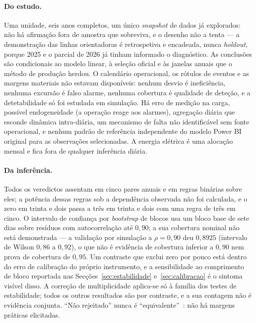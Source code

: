 \paragraph{Do estudo.} Uma unidade, seis anos completos, um único
\emph{snapshot} de dados já explorados: não há afirmação fora de amostra que
sobreviva, e o desenho não a tenta --- a demonstração das linhas
orientadoras é retrospetiva e encadeada, nunca \emph{holdout}, porque 2025 e
o parcial de 2026 já tinham informado o diagnóstico. As conclusões são
condicionais ao modelo linear, à seleção oficial e às janelas anuais que o
método de produção herdou. O calendário operacional, os rótulos de eventos e
as margens materiais não estavam disponíveis: nenhum desvio é ineficiência,
nenhuma excursão é falso alarme, nenhuma cobertura é qualidade de deteção,
e a detetabilidade só foi estudada em simulação. Há erro de medição na
carga, possível endogeneidade (a operação reage aos alarmes), agregação
diária que esconde dinâmica intra-diária, um mecanismo de falta não
identificável sem fonte operacional, e nenhum padrão de referência
independente do modelo Power BI original para as observações selecionadas.
A energia elétrica é uma alocação mensal e fica fora de qualquer inferência
diária.

\paragraph{Da inferência.} Todos os veredictos assentam em cinco pares
anuais e em regras binárias sobre eles; a potência dessas regras sob a
dependência observada não foi calculada, e o zero em trinta e dois passa a
três em trinta e dois com uma regra de três em cinco. O intervalo de
confiança por \emph{bootstrap} de blocos usa um bloco base de sete dias
sobre resíduos com autocorrelação até $0{,}90$; a sua cobertura nominal não
está demonstrada --- a validação por simulação a $\rho = 0{,}90$ deu
$0{,}8925$ (intervalo de Wilson $0{,}86$ a $0{,}92$), o que não é evidência
de cobertura inferior a $0{,}90$ nem prova de cobertura de $0{,}95$. Um
contraste que exclui zero por pouco está dentro do erro de calibração do
próprio instrumento, e a sensibilidade ao comprimento de bloco reportada
nas Secções~\ref{sec:estabilidade} e~\ref{sec:calibracao} é o sintoma
visível disso. A correção de multiplicidade aplica-se só à família dos
testes de estabilidade; todos os outros resultados são por contraste, e a
sua contagem não é evidência conjunta. ``Não rejeitado'' nunca é
``equivalente''~\cite{Lakens2017}: não há margens práticas elicitadas.

